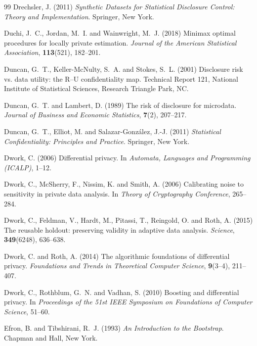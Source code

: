 \documentclass[11pt,a4paper]{article}
\theoremstyle{plain}
\theoremstyle{definition}
\begin{document}
\begin{thebibliography}{99}
Drechsler, J. (2011) \emph{Synthetic Datasets for Statistical Disclosure
Control: Theory and Implementation}. Springer, New York.

Duchi, J.~C., Jordan, M.~I. and Wainwright, M.~J. (2018) Minimax optimal
procedures for locally private estimation. \emph{Journal of the American
Statistical Association}, \textbf{113}(521), 182--201.

Duncan, G.~T., Keller-McNulty, S.~A. and Stokes, S.~L. (2001) Disclosure risk
vs. data utility: the R--U confidentiality map. Technical Report 121,
National Institute of Statistical Sciences, Research Triangle Park, NC.

Duncan, G.~T. and Lambert, D. (1989) The risk of disclosure for microdata.
\emph{Journal of Business and Economic Statistics}, \textbf{7}(2), 207--217.

Duncan, G.~T., Elliot, M. and Salazar-Gonz\'alez, J.-J. (2011)
\emph{Statistical Confidentiality: Principles and Practice}. Springer, New
York.

Dwork, C. (2006) Differential privacy. In \emph{Automata, Languages and
Programming (ICALP)}, 1--12.

Dwork, C., McSherry, F., Nissim, K. and Smith, A. (2006) Calibrating noise to
sensitivity in private data analysis. In \emph{Theory of Cryptography
Conference}, 265--284.

Dwork, C., Feldman, V., Hardt, M., Pitassi, T., Reingold, O. and Roth, A. (2015)
The reusable holdout: preserving validity in adaptive data analysis.
\emph{Science}, \textbf{349}(6248), 636--638.

Dwork, C. and Roth, A. (2014) The algorithmic foundations of differential
privacy. \emph{Foundations and Trends in Theoretical Computer Science},
\textbf{9}(3--4), 211--407.

Dwork, C., Rothblum, G.~N. and Vadhan, S. (2010) Boosting and differential
privacy. In \emph{Proceedings of the 51st IEEE Symposium on Foundations of
Computer Science}, 51--60.

Efron, B. and Tibshirani, R.~J. (1993) \emph{An Introduction to the Bootstrap}.
Chapman and Hall, New York.


\end{thebibliography}
\end{document}
